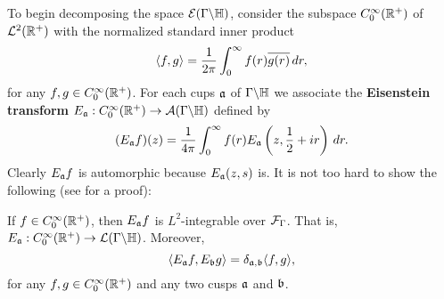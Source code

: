       To begin decomposing the space $\mathcal{E}(\Gamma\backslash\mathbb{H})$, consider the subspace $C_{0}^{\infty}(\mathbb{R}^{+})$ of $\mathcal{L}^{2}(\mathbb{R}^{+})$ with the normalized standard inner product
      \[
        \langle f,g\rangle = \frac{1}{2\pi}\int_{0}^{\infty}f(r)\overline{g(r)}\,dr,
      \]
      for any $f,g \in C_{0}^{\infty}(\mathbb{R}^{+})$. For each cups $\mathfrak{a}$ of $\Gamma\backslash\mathbb{H}$ we associate the \textbf{Eisenstein transform} $E_{\mathfrak{a}}:C_{0}^{\infty}(\mathbb{R}^{+}) \to \mathcal{A}(\Gamma\backslash\mathbb{H})$ defined by
      \[
        (E_{\mathfrak{a}}f)(z) = \frac{1}{4\pi}\int_{0}^{\infty}f(r)E_{\mathfrak{a}}\left(z,\frac{1}{2}+ir\right)\,dr.
      \]
      Clearly $E_{\mathfrak{a}}f$ is automorphic because $E_{\mathfrak{a}}(z,s)$ is. It is not too hard to show the following (see \cite{iwaniec2021spectral} for a proof):

      \begin{proposition}\label{prop:Eisenstein_transform_property}
        If $f \in C_{0}^{\infty}(\mathbb{R}^{+})$, then $E_{\mathfrak{a}}f$ is $L^{2}$-integrable over $\mathcal{F}_{\Gamma}$. That is, $E_{\mathfrak{a}}:C_{0}^{\infty}(\mathbb{R}^{+}) \to \mathcal{L}(\Gamma\backslash\mathbb{H})$. Moreover,
        \[
          \langle E_{\mathfrak{a}}f,E_{\mathfrak{b}}g\rangle = \delta_{\mathfrak{a},\mathfrak{b}}\langle f,g\rangle,
        \]
        for any $f,g \in C_{0}^{\infty}(\mathbb{R}^{+})$ and any two cusps $\mathfrak{a}$ and $\mathfrak{b}$.
      \end{proposition}

